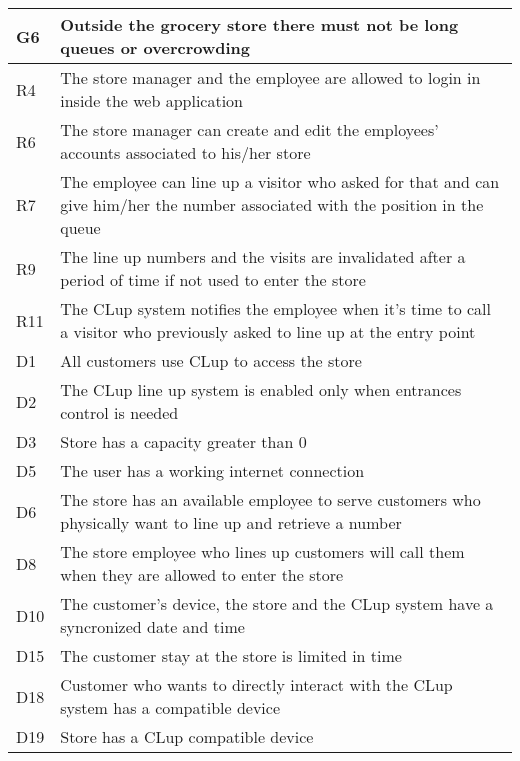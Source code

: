 \begin{center}
    {\renewcommand{\arraystretch}{1.5}
    \begin{longtable}{L{2cm}L{12cm}}
        \hline
        \textbf{G6} & \textbf{Outside the grocery store there must not be long queues or overcrowding} \\
        \hline
         R4 & The store manager and the employee are allowed to login in inside the web application \\
        \hline
         R6 & The store manager can create and edit the employees’ accounts associated to his/her store \\
        \hline
         R7 & The employee can line up a visitor who asked for that and can give him/her the number associated with the position in the queue \\
        \hline
         R9 & The line up numbers and the visits are invalidated after a period of time if not used to enter the store \\
        \hline
         R11 & The CLup system notifies the employee when it’s time to call a visitor who previously asked to line up at the entry point \\
        \hline
         D1 & All customers use CLup to access the store \\
        \hline
         D2 & The CLup line up system is enabled only when entrances control is needed \\
        \hline
         D3 & Store has a capacity greater than 0 \\
        \hline
         D5 & The user has a working internet connection \\
        \hline
         D6 & The store has an available employee to serve customers who physically want to line up and retrieve a number \\
        \hline
         D8 & The store employee who lines up customers will call them when they are allowed to enter the store \\
        \hline
         D10 & The customer’s device, the store and the CLup system have a syncronized date and time \\
        \hline
         D15 & The customer stay at the store is limited in time \\
        \hline
         D18 & Customer who wants to directly interact with the CLup system has a compatible device \\
        \hline
         D19 & Store has a CLup compatible device \\
        \hline
    \end{longtable}}


\end{center}
